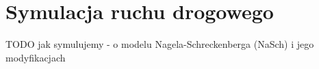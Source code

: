 \chapter{Symulacja ruchu drogowego}
\label{chap:symulacja}
TODO jak symulujemy - o modelu Nagela-Schreckenberga (NaSch) i jego modyfikacjach